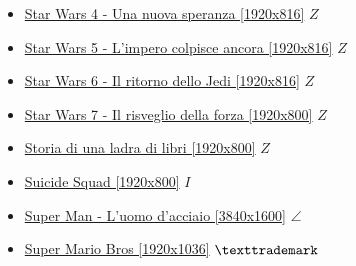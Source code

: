\begin{itemize}
			\item \href{https://mega.nz/#!RYwBDZRB!dnHTLqYd51J3QvbamdDzeR71rGTtDA-MaiXDMW-k7xA} {Star Wars 4 - Una nuova speranza [1920x816]}  $Z$ \\
			\item \href{https://mega.nz/#!dJBFUQIC!6P3kRs36bLrIhe25ZNUoF2PcRZpsh-VghJusWj0nSRI} {Star Wars 5 - L'impero colpisce ancora [1920x816]}  $Z$ \\
			\item \href{https://mega.nz/#!VNI2zL6T!3IU8zQaFZW7CHUPu5PA8dZXtmZkjWTel54QJ1PbiWf8} {Star Wars 6 - Il ritorno dello Jedi [1920x816]}  $Z$ \\
			\item \href{https://mega.nz/#!MUpkDYoa!xjvL_DaF8UfTFbaIT_zSH0EsnYp8CEI51r5D4r06sHc} {Star Wars 7 - Il risveglio della forza [1920x800]}  $Z$ \\
			\item \href{https://mega.nz/#!NdRXlZob!3ZHqVd2Yn73ZpkkCkPUAJ9pGFVcxS4VndzGogUlbwuA} {Storia di una ladra di libri [1920x800]}  $Z$ \\
			\item \href{https://mega.nz/#!3t8zFB5a!aw6kYfhPZKTrqSmc0L7uwfpyB0vTiTyrvCTha9ukyuA} {Suicide Squad [1920x800]}  $I$ \\
			\item \href{https://mega.nz/#!dzYwDD7I!G8jLJOtJRxXSmgJHq7QNVchfJrmJAavay_pm7ogL5vc} {Super Man - L'uomo d'acciaio [3840x1600]}  $\angle$ \\
			\item \href{https://mega.nz/#!2uQimKTL!hFKuEOu1xfT_GvsaV-os_BupiUOlsc8ZGxTLmq-lqBs} {Super Mario Bros [1920x1036]}  $\texttrademark$ \\
		
		\end{itemize}
	
